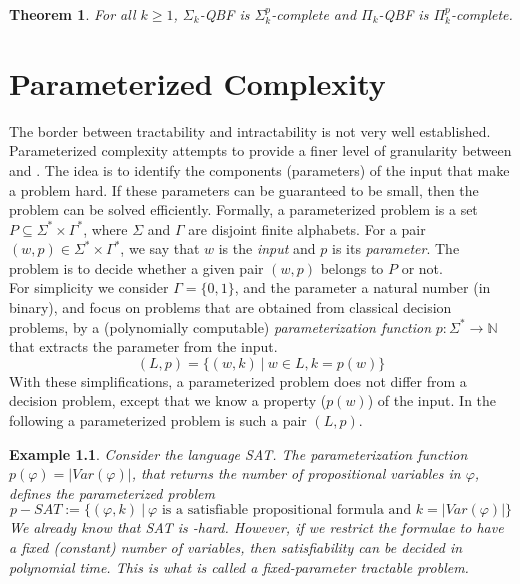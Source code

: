 \documentclass{report}
\newcommand{\NP}{\text{$\mathit{NP}$}\xspace}
\newcommand{\Po}{\text{$\mathit{P}$}\xspace}
\newtheorem{example}[definition]{Example}
\newtheorem{theorem}[definition]{Theorem}
\begin{document}
\begin{theorem}For all $k \geq 1$, $\Sigma_k$-QBF is $\Sigma_k^p$-complete and $\Pi_k$-QBF is $\Pi_k^p$-complete.
\end{theorem}

\chapter{Parameterized Complexity}\label{sec:parameterized-complexity}
The border between tractability and intractability is not very well established. Parameterized complexity attempts to provide a finer level of granularity between \Po and \NP. The idea is to identify the components (parameters) of the input that make a problem hard. If these parameters can be guaranteed to be small, then the problem can be solved efficiently. Formally, a parameterized problem is a set $P \subseteq \Sigma^* \times \Gamma^*$, where $\Sigma$ and $\Gamma$ are disjoint finite alphabets. For a pair $(w,p) \in \Sigma^* \times \Gamma^*$, we say that $w$ is the \textit{input} and $p$ is its \textit{parameter}. The problem is to decide whether a given pair $(w,p)$ belongs to $P$ or not.\\

For simplicity we consider $\Gamma = \{0,1\}$, and the parameter a natural number (in binary), and focus on problems that are obtained from classical decision problems, by a (polynomially computable) \textit{parameterization function} $p: \Sigma^* \rightarrow \mathbb{N}$ that extracts the parameter from the input.
\[ (L,p) = \{(w,k)\ |\ w \in L, k = p(w) \} \]
With these simplifications, a parameterized problem does not differ from a decision problem, except that we know a property ($p(w)$) of the input. In the following a parameterized problem is such a pair $(L,p)$.

\begin{example}Consider the language SAT. The parameterization function $p(\varphi) = |Var(\varphi)|$, that returns the number of propositional variables in $\varphi$, defines the parameterized problem
\[p-SAT := \{(\varphi,k)\ |\ \varphi \text{ is a satisfiable propositional formula and } k=|Var(\varphi)|\}\]
We already know that SAT is \NP-hard. However, if we restrict the formulae to have a fixed (constant) number of variables, then satisfiability can be decided in polynomial time. This is what is called a fixed-parameter tractable problem.
\end{example}
\end{document}
